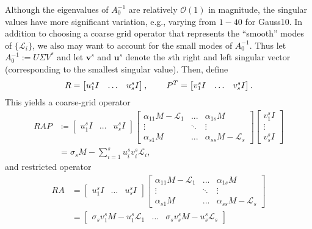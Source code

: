 \documentclass[a4paper,10pt]{article}
\begin{document}
Although the eigenvalues of $A_0^{-1}$ are relatively $\mathcal{O}(1)$ in magnitude,
the singular values have more significant variation, e.g., varying from $1-40$ for
Gauss10. In addition to choosing a coarse grid operator that represents the ``smooth''
modes of $\{\mathcal{L}_i\}$, we also may want to account for the small modes of
$A_0^{-1}$. Thus let $A_0^{-1} := U\Sigma V^*$ and let $\mathbf{v}^s$ and
$\mathbf{u}^s$ denote the $s$th right and left singular vector (corresponding
to the smallest singular value). Then, define 
%
\begin{align*} 
R = \begin{bmatrix} {u}^s_1 I & \hdots & {u}^s_s I \end{bmatrix},
\hspace{5ex}
P^T = \begin{bmatrix} {v}^s_1 I & \hdots & {v}^s_s I \end{bmatrix}.
\end{align*}
%
This yields a coarse-grid operator
%
\begin{align}\nonumber
RAP & \coloneqq \begin{bmatrix} {u}^s_1 I & \hdots & {u}^s_s I \end{bmatrix}
	\begin{bmatrix} \alpha_{11} M - \mathcal{L}_1 & ... & \alpha_{1s}M  \\
		\vdots & \ddots & \vdots \\ \alpha_{s1}M &  ... & \alpha_{ss}M - \mathcal{L}_s\end{bmatrix}
	\begin{bmatrix} {v}^s_1 I \\ \vdots \\ {v}^s_s I\end{bmatrix} \\
& = \sigma_sM - \sum_{i=1}^s {u}^s_i{v}^s_i\mathcal{L}_i \label{eq:cg_sv},
\end{align}
%
and restricted operator
%
\begin{align}\nonumber
RA & = \begin{bmatrix} {u}^s_1 I & \hdots & {u}^s_s I \end{bmatrix}
	\begin{bmatrix} \alpha_{11} M - \mathcal{L}_1 & ... & \alpha_{1s}M  \\
		\vdots & \ddots & \vdots \\ \alpha_{s1}M &  ... & \alpha_{ss}M - \mathcal{L}_s\end{bmatrix} \\
& = \begin{bmatrix} \sigma_s{v}^s_1M - {u}^s_1 \mathcal{L}_1 & \hdots &
	\sigma_s{v}^s_sM - {u}^s_s \mathcal{L}_s \end{bmatrix}\label{eq:ra_sv}
\end{align}
%
\end{document}
